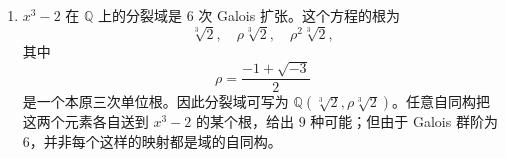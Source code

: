 \begin{enumerate}[label=(\arabic*)]
与 $\operatorname{Gal}(\mathbb Q(\sqrt2,\sqrt3)/\mathbb Q)$ 的每个子群相联系的是 $\mathbb Q(\sqrt2,\sqrt3)$ 的相应固定子域。例如，与 $\{1,\sigma\tau\}$ 相应的子域是被映射
\[
\sigma\tau:a+b\sqrt2+c\sqrt3+d\sqrt6\longmapsto a-b\sqrt2-c\sqrt3+d\sqrt6
\]
固定的元素集合，这就是元素 $a+d\sqrt6$ 的集合，即域 $\mathbb Q(\sqrt6)$。类似地可以确定 Galois 群的其他子群的固定域：
\[
\begin{array}{c|c}
\text{子群} & \text{固定域}\\ \hline
\{1\} & \mathbb Q(\sqrt2,\sqrt3)\\
\{1,\sigma\} & \mathbb Q(\sqrt3)\\
\{1,\sigma\tau\} & \mathbb Q(\sqrt6)\\
\{1,\tau\} & \mathbb Q(\sqrt2)\\
\{1,\sigma,\tau,\sigma\tau\} & \mathbb Q
\end{array}
\]

\item $x^3-2$ 在 $\mathbb Q$ 上的分裂域是 $6$ 次 Galois 扩张。这个方程的根为
\[
\sqrt[3]{2},\quad \rho\sqrt[3]{2},\quad \rho^2\sqrt[3]{2},
\]
其中
\[
\rho=\frac{-1+\sqrt{-3}}{2}
\]
是一个本原三次单位根。因此分裂域可写为 $\mathbb Q(\sqrt[3]{2},\rho\sqrt[3]{2})$。任意自同构把这两个元素各自送到 $x^3-2$ 的某个根，给出 $9$ 种可能；但由于 Galois 群阶为 $6$，并非每个这样的映射都是域的自同构。


\end{enumerate}
